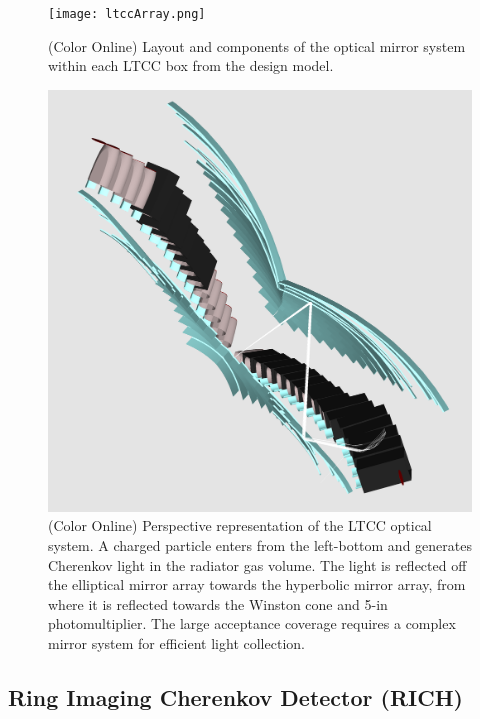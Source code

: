 \documentclass[final,3p,twocolumn]{elsarticle}
\begin{document}
\begin{figure}[htbp!]
\centerline{\texttt{[image: ltccArray.png]}}
\caption{(Color Online) Layout and components of the optical mirror system within each LTCC box from the design model.}
\label{ltcc1}
\end{figure}
\begin{figure}[htbp!]
\centerline{\includegraphics[width=1.0\columnwidth]{ltcc-mod6.png}}
\caption{(Color Online) Perspective representation of the LTCC optical system. A charged particle enters from the left-bottom and
generates Cherenkov light in the radiator gas volume. The light is reflected off the elliptical mirror array towards the
hyperbolic mirror array, from where it is reflected towards the Winston cone and 5-in photomultiplier. The large
acceptance coverage requires a complex mirror system for efficient light collection. }
\label{ltcc2}
\end{figure}

\subsection{Ring Imaging Cherenkov Detector (RICH)} 
\end{document}
